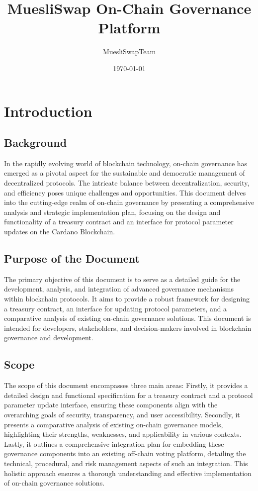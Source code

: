 \documentclass[11pt]{article}
\title{MuesliSwap On-Chain Governance Platform}
\author{MuesliSwapTeam}
\date{\today}
\begin{document}
\maketitle

\section{Introduction}
\subsection{Background}
In the rapidly evolving world of blockchain technology, on-chain governance has emerged as a pivotal aspect for the sustainable and democratic management of decentralized protocols.
The intricate balance between decentralization, security, and efficiency poses unique challenges and opportunities.
This document delves into the cutting-edge realm of on-chain governance by presenting a comprehensive analysis and strategic implementation plan, focusing on the design and functionality of a treasury contract and an interface for protocol parameter updates on the Cardano Blockchain.

\subsection{Purpose of the Document}
The primary objective of this document is to serve as a detailed guide for the development, analysis, and integration of advanced governance mechanisms within blockchain protocols.
It aims to provide a robust framework for designing a treasury contract, an interface for updating protocol parameters, and a comparative analysis of existing on-chain governance solutions.
This document is intended for developers, stakeholders, and decision-makers involved in blockchain governance and development.

\subsection{Scope}
The scope of this document encompasses three main areas:
Firstly, it provides a detailed design and functional specification for a treasury contract and a protocol parameter update interface, ensuring these components align with the overarching goals of security, transparency, and user accessibility.
Secondly, it presents a comparative analysis of existing on-chain governance models, highlighting their strengths, weaknesses, and applicability in various contexts.
Lastly, it outlines a comprehensive integration plan for embedding these governance components into an existing off-chain voting platform, detailing the technical, procedural, and risk management aspects of such an integration.
This holistic approach ensures a thorough understanding and effective implementation of on-chain governance solutions.
\end{document}
